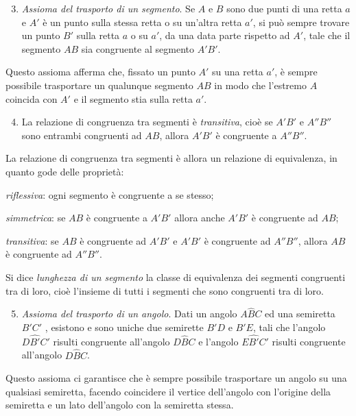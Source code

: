 \begin{enumerate}[label=\Roman{*}.]
\setcounter{enumi}{2}
\item \emph{Assioma del trasporto di un segmento}. Se $A$ e $B$ sono 
due punti di una retta $a$ e $A'$ è un punto sulla stessa retta o su 
un'altra retta $a'$, si può sempre trovare un punto $B'$ sulla retta 
$a$ o su $a'$, da una data parte rispetto ad $A'$, tale che il 
segmento $AB$ sia congruente al segmento $A'B'$.
\end{enumerate}
Questo assioma afferma che, fissato un punto $A'$ su una retta $a'$, 
è sempre possibile trasportare un qualunque segmento $AB$ in modo che 
l'estremo $A$ coincida con $A'$ e il segmento stia sulla retta $a'$.

\begin{enumerate}[label=\Roman{*}.]
\setcounter{enumi}{3}
\item La relazione di congruenza tra segmenti è \emph{transitiva}, 
cioè se $A'B'$ e $A''B''$ sono entrambi congruenti ad $AB$, allora 
$A'B'$ è congruente a $A''B''$.
\end{enumerate}
La relazione di congruenza tra segmenti è allora un relazione di 
equivalenza, in quanto gode delle proprietà:
\begin{enumeratea}
\item \emph{riflessiva}: ogni segmento è congruente a se stesso;
\item \emph{simmetrica}: se $AB$ è congruente a $A'B'$ allora anche 
$A'B'$ è congruente ad $AB$;
\item \emph{transitiva}: se $AB$ è congruente ad $A'B'$ e $A'B'$ è 
congruente ad $A''B''$, allora $AB$ è congruente ad $A''B''$.
\end{enumeratea}

\begin{definizione}
Si dice \emph{lunghezza di un segmento} la classe di equivalenza dei 
segmenti congruenti tra di loro, cioè l'insieme di tutti i segmenti 
che sono congruenti tra di loro.
\end{definizione}

\begin{enumerate}[label=\Roman{*}.]
\setcounter{enumi}{4}
\item \emph{Assioma del trasporto di un angolo}. Dati un angolo 
$A\widehat{B}C$ ed una semiretta $B'C'$ , esistono e sono uniche due 
semirette $B'D$ e $B'E$, tali che l'angolo $D\widehat{B'}C'$ risulti 
congruente all'angolo $D\widehat{B}C$ e l'angolo $E\widehat{B'}C'$ 
risulti congruente all'angolo $D\widehat{B}C$.
\end{enumerate}
Questo assioma ci garantisce che è sempre possibile trasportare un 
angolo su una qualsiasi semiretta, facendo coincidere il vertice 
dell'angolo con l'origine della semiretta e un lato dell'angolo con 
la semiretta stessa.

